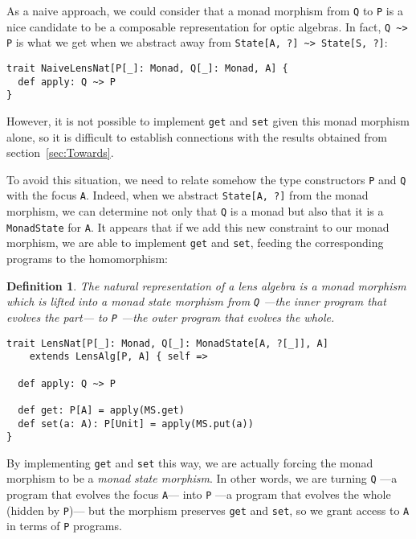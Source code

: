 \documentclass[preview, 3p]{elsarticle}
\newtheorem{definition}{Definition}[section]
\begin{document}
As a naive approach, we could consider that a monad morphism from \lstinline{Q}
to \lstinline{P} is a nice candidate to be a composable representation for optic
algebras. In fact, \lstinline{Q ~> P} is what we get when we abstract away from
\lstinline{State[A, ?] ~> State[S, ?]}:
\begin{lstlisting}
trait NaiveLensNat[P[_]: Monad, Q[_]: Monad, A] {
  def apply: Q ~> P
}
\end{lstlisting}
However, it is not possible to implement \lstinline{get} and \lstinline{set}
given this monad morphism alone, so it is difficult to establish connections
with the results obtained from section~\ref{sec:Towards}.

To avoid this situation, we need to relate somehow the type constructors
\lstinline{P} and \lstinline{Q} with the focus \lstinline{A}. Indeed, when we
abstract \lstinline{State[A, ?]} from the monad morphism, we can determine not
only that \lstinline{Q} is a monad but also that it is a \lstinline{MonadState}
for \lstinline{A}. It appears that if we add this new constraint to our monad
morphism, we are able to implement \lstinline{get} and \lstinline{set}, feeding
the corresponding programs to the homomorphism:

\begin{definition}

The natural representation of a lens algebra is a monad morphism which is lifted
into a monad state morphism from \lstinline{Q} ---the inner program that evolves
the part--- to \lstinline{P} ---the outer program that evolves the whole.

\begin{lstlisting}
trait LensNat[P[_]: Monad, Q[_]: MonadState[A, ?[_]], A]
    extends LensAlg[P, A] { self =>

  def apply: Q ~> P

  def get: P[A] = apply(MS.get)
  def set(a: A): P[Unit] = apply(MS.put(a))
}
\end{lstlisting}

\end{definition}

By implementing \lstinline{get} and \lstinline{set} this way, we are actually
forcing the monad morphism to be a \emph{monad state morphism}. In other words,
we are turning \lstinline{Q} ---a program that evolves the focus
\lstinline{A}--- into \lstinline{P} ---a program that evolves the whole (hidden
by \lstinline{P})--- but the morphism preserves \lstinline{get} and
\lstinline{set}, so we grant access to \lstinline{A} in terms of \lstinline{P}
programs.
\end{document}
